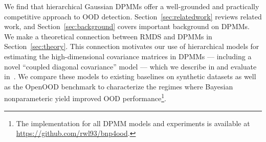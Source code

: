 We find that hierarchical Gaussian DPMMs offer a well-grounded and practically competitive approach to OOD detection.
Section~\ref{sec:relatedwork} reviews related work, and Section~\ref{sec:background} covers important background on DPMMs.
We make a theoretical connection between RMDS and DPMMs in Section~\ref{sec:theory}.
This connection motivates our use of hierarchical models for estimating the high-dimensional covariance matrices in DPMMs --- including a novel ``coupled diagonal covariance'' model --- which we describe in  and evaluate in~.
We compare these models to existing baselines on synthetic datasets as well as the OpenOOD benchmark to characterize the regimes where Bayesian nonparameteric yield improved OOD performance\footnote{The implementation for all DPMM models and experiments is available at \url{https://github.com/rwl93/bnp4ood}.}.

